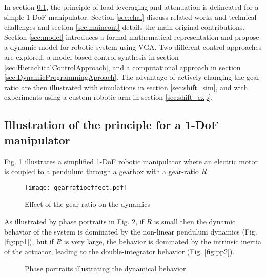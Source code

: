 In section \ref{sec:princ}, the principle of load leveraging and attenuation is delineated for a simple 1-DoF manipulator. Section \ref{sec:chal} discuss related works and technical challenges and section \ref{sec:maincont} details the main original contributions. Section \ref{sec:model} introduces a formal mathematical representation and propose a dynamic model for robotic system using VGA. Two different control approaches are explored, a model-based control synthesis in section \ref{sec:HierachicalControlApproach}, and a computational approach in section \ref{sec:DynamicProgrammingAproach}. The advantage of actively changing the gear-ratio are then illustrated with simulations in section \ref{sec:shift_sim}, and with experiments using a custom robotic arm in section \ref{sec:shift_exp}.

\subsection{Illustration of the principle for a 1-DoF manipulator}
\label{sec:princ}

Fig. \ref{fig:bigpicture} illustrates a simplified 1-DoF robotic manipulator where an electric motor is coupled to a pendulum through a gearbox with a gear-ratio $R$.
%
\begin{figure}[ht]
	\centering
		\texttt{[image: gearratioeffect.pdf]}
	\caption{Effect of the gear ratio on the dynamics}
	\label{fig:bigpicture}
\end{figure}
%
As illustrated by phase portraits in Fig. \ref{fig:pp}, if $R$ is small then the dynamic behavior of the system is dominated by the non-linear pendulum dynamics (Fig. \ref{fig:pp1}), but if $R$ is very large, the behavior is dominated by the intrinsic inertia of the actuator, leading to the double-integrator behavior (Fig. \ref{fig:pp2}).
%
\begin{figure}[ht]
        \centering
        \caption{Phase portraits illustrating the dynamical behavior}
				\label{fig:pp}
\end{figure}

